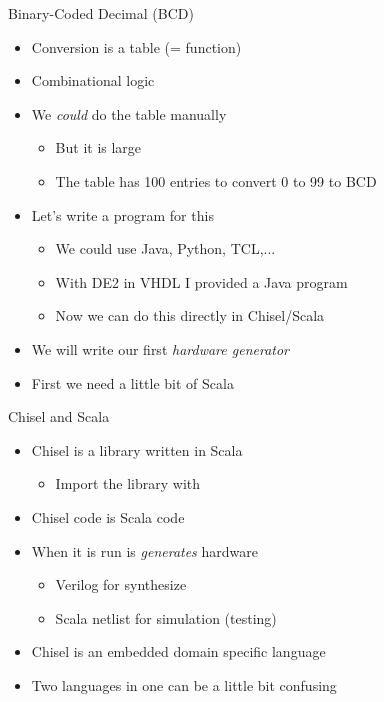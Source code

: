 \begin{frame}[fragile]{Binary-Coded Decimal (BCD)}
\begin{itemize}
\item Conversion is a table (= function)
\item Combinational logic
\item We \emph{could} do the table manually
\begin{itemize}
\item But it is large
\item The table has 100 entries to convert 0 to 99 to BCD
\end{itemize}
\item Let's write a program for this
\begin{itemize}
\item We could use Java, Python, TCL,...
\item With DE2 in VHDL I provided a Java program
\item Now we can do this directly in Chisel/Scala
\end{itemize}
\item We will write our first \emph{hardware generator}
\item First we need a little bit of Scala
\end{itemize}
\end{frame}



\begin{frame}[fragile]{Chisel and Scala}
\begin{itemize}
\item Chisel is a library written in Scala
\begin{itemize}
\item Import the library with 
\end{itemize}
\item Chisel code is Scala code
\item When it is run is \emph{generates} hardware
\begin{itemize}
\item Verilog for synthesize
\item Scala netlist for simulation (testing)
\end{itemize}
\item Chisel is an embedded domain specific language
\item Two languages in one can be a little bit confusing
\end{itemize}
\end{frame}

